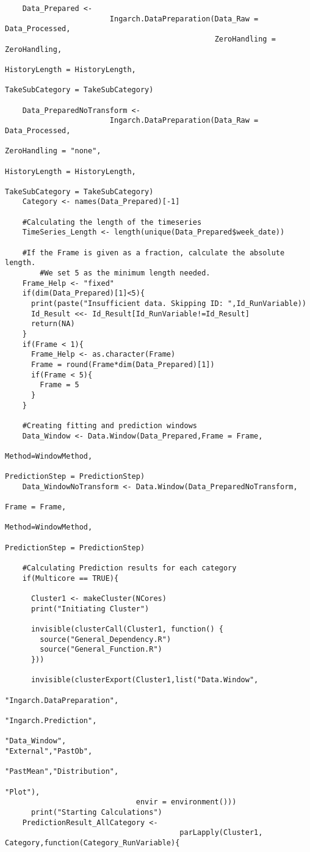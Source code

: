 \begin{verbatim}
    Data_Prepared <- 
						Ingarch.DataPreparation(Data_Raw = Data_Processed,
						                        ZeroHandling = ZeroHandling,
																		HistoryLength = HistoryLength,
																		TakeSubCategory = TakeSubCategory)
    
    Data_PreparedNoTransform <- 
						Ingarch.DataPreparation(Data_Raw = Data_Processed,
																		ZeroHandling = "none",
																		HistoryLength = HistoryLength,
																		TakeSubCategory = TakeSubCategory)
    Category <- names(Data_Prepared)[-1]
    
    #Calculating the length of the timeseries
    TimeSeries_Length <- length(unique(Data_Prepared$week_date))
    
    #If the Frame is given as a fraction, calculate the absolute length. 
		#We set 5 as the minimum length needed.
    Frame_Help <- "fixed"
    if(dim(Data_Prepared)[1]<5){
      print(paste("Insufficient data. Skipping ID: ",Id_RunVariable))
      Id_Result <<- Id_Result[Id_RunVariable!=Id_Result]
      return(NA)
    }
    if(Frame < 1){
      Frame_Help <- as.character(Frame)
      Frame = round(Frame*dim(Data_Prepared)[1])
      if(Frame < 5){
        Frame = 5
      }
    }
    
    #Creating fitting and prediction windows
    Data_Window <- Data.Window(Data_Prepared,Frame = Frame,
															 Method=WindowMethod,
														   PredictionStep = PredictionStep)
    Data_WindowNoTransform <- Data.Window(Data_PreparedNoTransform,
																					Frame = Frame,
																					Method=WindowMethod,
																					PredictionStep = PredictionStep)
  
    #Calculating Prediction results for each category 
    if(Multicore == TRUE){
      
      Cluster1 <- makeCluster(NCores)
      print("Initiating Cluster")
      
      invisible(clusterCall(Cluster1, function() {
        source("General_Dependency.R")
        source("General_Function.R")
      }))
      
      invisible(clusterExport(Cluster1,list("Data.Window",
																						"Ingarch.DataPreparation",
																						"Ingarch.Prediction",
																						"Data_Window",
"External","PastOb",
																						"PastMean","Distribution",
																						"Plot"),
                              envir = environment()))
      print("Starting Calculations")
    PredictionResult_AllCategory <- 
										parLapply(Cluster1, Category,function(Category_RunVariable){
      

\end{verbatim}
